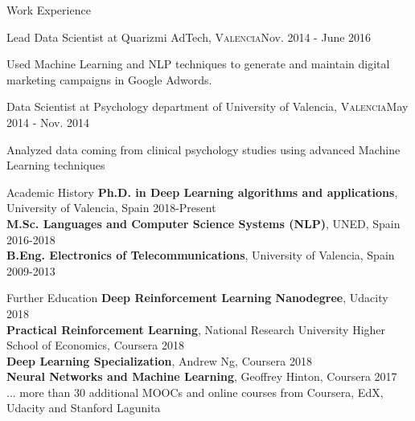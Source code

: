 \documentclass{resume} %
\begin{document}
\begin{rSection}{ Work Experience }
\begin{rSubsection}{Lead Data Scientist at Quarizmi AdTech, \textnormal{\textsc{Valencia}}}{Nov. 2014 - June 2016}{}
    \vspace{-3pt}
    
    \item Used Machine Learning and NLP techniques to generate and maintain digital marketing campaigns in Google Adwords.
\end{rSubsection} 

\vspace{-6pt}

\begin{rSubsection}{Data Scientist at Psychology department of University of Valencia, \textnormal{\textsc{Valencia}}}{May 2014 - Nov. 2014}{}

    \vspace{-3pt}
    
    \item Analyzed data coming from clinical psychology studies using advanced Machine Learning techniques

\end{rSubsection}


\end{rSection}


\begin{rSection}{Academic History}
{\textbf{Ph.D. in Deep Learning algorithms and applications}, University of Valencia, Spain} \hfill {2018-Present}
\\
{\textbf{M.Sc. Languages and Computer Science Systems (NLP)}, UNED, Spain} \hfill {2016-2018}
\\
{\textbf{B.Eng. Electronics of Telecommunications}, University of Valencia, Spain} \hfill {2009-2013}
\end{rSection}

\begin{rSection}{Further Education}
{\textbf{Deep Reinforcement Learning Nanodegree}, Udacity} \hfill {2018}\\
{\textbf{Practical Reinforcement Learning}, National Research University Higher School of Economics, Coursera} \hfill {2018}\\
{\textbf{Deep Learning Specialization}, Andrew Ng, Coursera} \hfill {2018}\\
{\textbf{Neural Networks and Machine Learning}, Geoffrey Hinton, Coursera \hfill {2017}}\\
{... more than 30 additional MOOCs and online courses from Coursera, EdX, Udacity and Stanford Lagunita}
\end{rSection}
\end{document}
